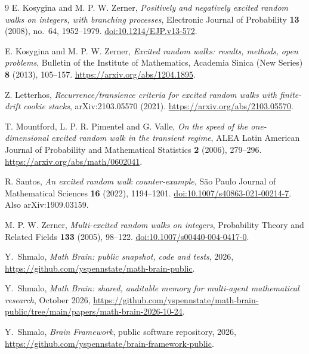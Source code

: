 \documentclass[11pt]{amsart}
\numberwithin{equation}{section}
\theoremstyle{remark}
\begin{document}
\begin{thebibliography}{9}
E. Kosygina and M. P. W. Zerner,
\emph{Positively and negatively excited random walks on integers, with branching processes},
Electronic Journal of Probability \textbf{13} (2008), no.~64, 1952--1979.
\href{https://doi.org/10.1214/EJP.v13-572}{doi:10.1214/EJP.v13-572}.

E. Kosygina and M. P. W. Zerner,
\emph{Excited random walks: results, methods, open problems},
Bulletin of the Institute of Mathematics, Academia Sinica (New Series) \textbf{8} (2013), 105--157.
\url{https://arxiv.org/abs/1204.1895}.

Z. Letterhos,
\emph{Recurrence/transience criteria for excited random walks with finite-drift cookie stacks},
arXiv:2103.05570 (2021). \url{https://arxiv.org/abs/2103.05570}.

T. Mountford, L. P. R. Pimentel and G. Valle,
\emph{On the speed of the one-dimensional excited random walk in the transient regime},
ALEA Latin American Journal of Probability and Mathematical Statistics \textbf{2} (2006), 279--296.
\url{https://arxiv.org/abs/math/0602041}.

R. Santos,
\emph{An excited random walk counter-example},
S\~ao Paulo Journal of Mathematical Sciences \textbf{16} (2022), 1194--1201.
\href{https://doi.org/10.1007/s40863-021-00214-7}{doi:10.1007/s40863-021-00214-7}. Also arXiv:1909.03159.

M. P. W. Zerner,
\emph{Multi-excited random walks on integers},
Probability Theory and Related Fields \textbf{133} (2005), 98--122.
\href{https://doi.org/10.1007/s00440-004-0417-0}{doi:10.1007/s00440-004-0417-0}.

 Y.~Shmalo, \emph{Math Brain: public snapshot, code and tests}, 2026, \url{https://github.com/yspennstate/math-brain-public}.

 Y.~Shmalo, \emph{Math Brain: shared, auditable memory for multi-agent mathematical research}, October 2026, \url{https://github.com/yspennstate/math-brain-public/tree/main/papers/math-brain-2026-10-24}.

 Y.~Shmalo, \emph{Brain Framework}, public software repository, 2026, \url{https://github.com/yspennstate/brain-framework-public}.

\end{thebibliography}
\end{document}
